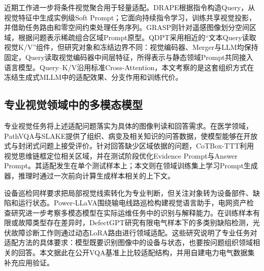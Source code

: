 近期工作进一步将条件视觉聚合用于轻量适配。DRAPE根据指令构造Query，从视觉特征中生成实例级Soft Prompt；它面向持续指令学习，训练共享视觉投影，并借助任务路由和零空间约束处理任务序列\cite{Hu2026DynamicCP}。GRASP则针对遥感图像划分空间区域，根据问题表示稀疏组合区域Prompt原型\cite{Sun2026GRASPGR}。QDPT采用相近的“文本Query读取视觉K/V”组件，但研究对象和冻结边界不同：视觉编码器、Merger与LLM均保持固定，Query读取视觉编码器中间层特征，所得表示与静态领域Prompt共同接入语言模型。Query--K/V沿用标准Cross-Attention，本文考察的是这套组织方式在冻结生成式MLLM中的适配效果、分支作用和训练代价。

\subsection{专业视觉领域中的多模态模型}

专业视觉任务将上述适配问题落实为具体的图像判读和回答需求。在医学领域，PathVQA与SLAKE提供了组织、病变及相关知识的问答数据，使模型能够在开放式与封闭式问题上接受评价\cite{He2020PathVQA3Q,Liu2021SlakeAS}。针对回答缺少区域依据的问题，CoTBox-TTT利用视觉思维链框定位相关区域，并在测试阶段优化Evidence Prompt与Answer Prompt\cite{Qian2025CoTBoxTTTGM}。其适配发生在单个测试样本上；本文则在领域训练集上学习Prompt生成器，推理时通过一次前向计算生成样本相关的上下文。

设备巡检同样要求把局部视觉线索转化为专业判断，但关注对象转为设备部件、缺陷和运行状态。Power-LLaVA围绕输电线路巡检构建视觉语言助手\cite{Wang2024PowerLLaVALL}，电网资产检查研究进一步考察多模态模型在实际运维任务中的识别与解释能力\cite{Rocha2025AdvancesIE,Hao2025PowerGI}。在训练样本有限或故障类型存在差异时，DefectGPT研究有限电气样本下的多类别缺陷检测\cite{lin2025defectgpt}，光伏故障诊断工作则通过动态LoRA路由进行领域适配\cite{Wu2026DomainAdaptiveML}。这些研究说明了专业任务对适配方法的具体要求：模型既要识别图像中的设备与状态，也要按问题组织领域相关的回答。本文据此在公开VQA基准上比较适配结构，并用自建电力电气数据集补充应用验证。
